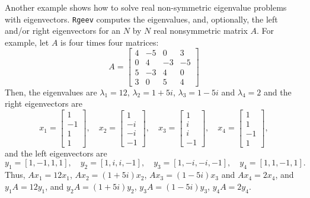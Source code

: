 \documentclass[12pt]{article}
\begin{document}
Another example shows how to solve real non-symmetric eigenvalue problems with eigenvectors. {\tt Rgeev} computes the eigenvalues, and, optionally, the left and/or right eigenvectors  for an $N$ by $N$ real nonsymmetric matrix $A$.
For example, let $A$ is four times four matrices:
\[
A=\left[\begin{array}{rrrr}4 & -5 & 0 & 3 \\ 0 & 4 & -3 & -5 \\ 5 & -3 & 4 & 0 \\ 3 & 0 & 5 & 4\end{array}\right]
\]
Then, the eigenvalues are $\lambda_1= 12$, $\lambda_2= 1+5i$, $\lambda_3 = 1-5i$ and $\lambda_4=2$ and the right eigenvectors are
\[
{x}_{1}=\left[\begin{array}{r}1 \\ -1 \\ 1 \\ 1\end{array}\right], \quad {x}_{2}=\left[\begin{array}{c}1 \\ -i \\ -i \\ -1\end{array}\right], \quad {x}_{3}=\left[\begin{array}{c}1 \\ i \\ i \\ -1\end{array}\right], \quad {x}_{4}=\left[\begin{array}{c}1 \\ 1 \\ -1 \\ 1\end{array}\right],
\]
and the left eigenvectors are
\[
{y}_{1}=[1,-1,1,1], \quad {y}_{2}=[1, i, i,-1], \quad {y}_{3}=[1,-i,-i,-1], \quad {y}_{4}=[1,1,-1,1].
\]
Thus, $Ax_1 = 12 x_1$, $Ax_2 = (1+5i) x_2$, $Ax_3 = (1-5i) x_3$ and $Ax_4 = 2 x_4$,
and $y_1 A = 12 y_1$, and $y_2 A = (1+5i) y_2$, $y_3 A = (1-5i) y_3$, $y_4 A = 2 y_4$.
\end{document}
